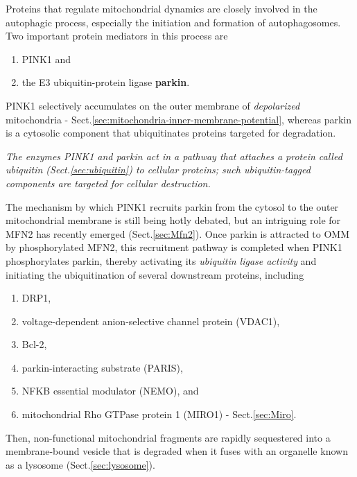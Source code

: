Proteins that regulate mitochondrial dynamics are closely involved in the autophagic process, especially the initiation and formation of autophagosomes.
Two important protein mediators in this process are
\begin{enumerate}
  \item PINK1 and 
  
  \item the E3 ubiquitin-protein ligase {\bf parkin}.
\end{enumerate} 
 PINK1 selectively accumulates on the outer membrane
of {\it depolarized} mitochondria -
Sect.\ref{sec:mitochondria-inner-membrane-potential}, whereas parkin is a
cytosolic component that ubiquitinates proteins targeted for degradation.

{\it The enzymes PINK1 and parkin act in a pathway that attaches a protein
called ubiquitin (Sect.\ref{sec:ubiquitin}) to cellular proteins; such
ubiquitin-tagged components are targeted for cellular destruction.}

The mechanism by which PINK1 recruits parkin from the cytosol to the outer
mitochondrial membrane is still being hotly debated, but an intriguing role for
MFN2 has recently emerged (Sect.\ref{sec:Mfn2}). Once parkin is attracted to OMM
by phosphorylated MFN2, this recruitment pathway is completed when PINK1
phosphorylates parkin, thereby activating its {\it ubiquitin ligase activity} and
initiating the ubiquitination of several downstream proteins, including 
\begin{enumerate}
  \item DRP1,

  \item voltage-dependent anion-selective channel protein (VDAC1), 
  
  \item Bcl-2,

  \item parkin-interacting substrate (PARIS), 
  
  \item NFKB essential modulator (NEMO), and
  
  \item mitochondrial Rho GTPase protein 1 (MIRO1) - Sect.\ref{sec:Miro}.
\end{enumerate}

Then, non-functional mitochondrial fragments are rapidly sequestered into a
membrane-bound vesicle that is degraded when it fuses with an organelle known as
a lysosome (Sect.\ref{sec:lysosome}).


